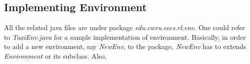 \documentclass[11pt]{article} %
\begin{document}
\subsection{Implementing Environment}
All the related java files are under package {\it edu.cwru.eecs.rl.env}. One could refer to {\it TaxiEnv.java} for a sample implementation of environment. Basically, in order to add a new environment, say {\it NewEnv}, to the package, {\it NewEnv} has to extends {\it Environment} or its subclass. Also, {\it }

{}

\end{document}
